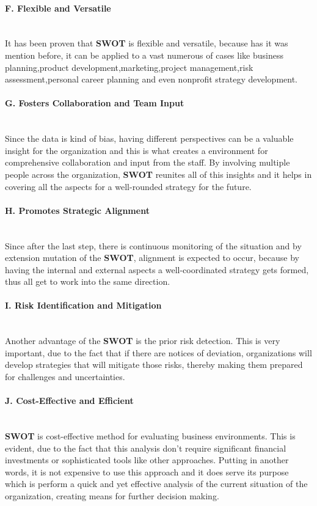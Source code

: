 \paragraph{F. Flexible and Versatile}\mbox{}\\
It has been proven that \textbf{SWOT} is flexible and versatile, because has it was mention before, it can be applied to a vast numerous of cases like business planning,product development,marketing,project management,risk assessment,personal career planning and even nonprofit strategy development.

\paragraph{G. Fosters Collaboration and Team Input}\mbox{}\\
Since the data is kind of bias, having different perspectives can be a valuable insight for the organization and this is what creates a environment for comprehensive collaboration and input from the staff. By involving multiple people across the organization, \textbf{SWOT} reunites all of this insights and it helps in covering all the aspects for a well-rounded strategy for the future.

\paragraph{H. Promotes Strategic Alignment}\mbox{}\\
Since after the last step, there is continuous monitoring of the situation and by extension mutation of the \textbf{SWOT}, alignment is expected to occur, because by having the internal and external aspects a well-coordinated strategy gets formed,  thus all get to work into the same direction.

\paragraph{I. Risk Identification and Mitigation}\mbox{}\\
Another advantage of the \textbf{SWOT} is the prior risk detection. This is very important, due to the fact that if there are notices of deviation, organizations will develop strategies that will mitigate those risks, thereby making them prepared for challenges and uncertainties.

\paragraph{J. Cost-Effective and Efficient}\mbox{}\\
\textbf{SWOT} is cost-effective method for evaluating business environments. This is evident, due to the fact that this analysis don't require significant financial investments or sophisticated tools like other approaches. Putting in another words, it is not expensive to use this approach and it does serve its purpose which is perform a quick and yet effective analysis of the current situation of the organization, creating means for further decision making.

